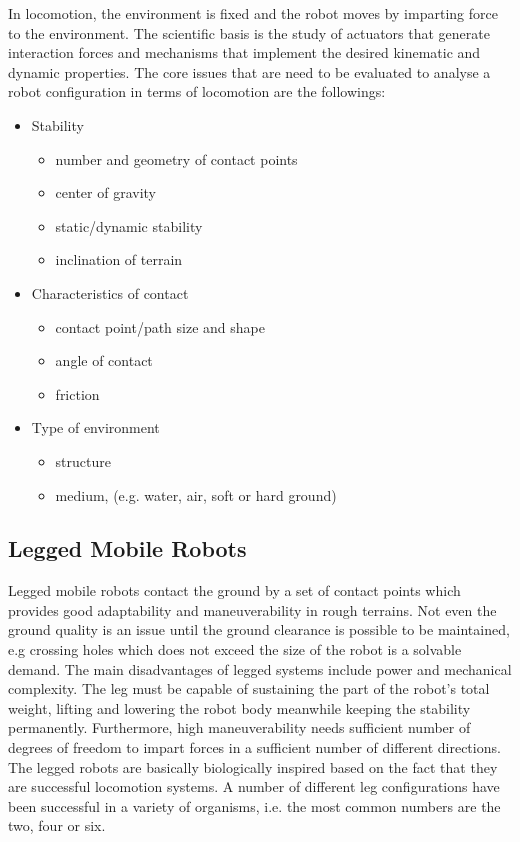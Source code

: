\documentclass[12pt,english]{article}
\begin{document}
In locomotion, the environment is fixed and the robot moves by imparting force to the environment. The scientific basis is the study of actuators that generate interaction forces and mechanisms that implement the desired kinematic and dynamic properties. The core issues that are need to be evaluated to analyse a robot configuration in terms of locomotion are the followings:
\begin{itemize}
	\item Stability
		\begin{itemize}
			\item number and geometry of contact points
			\item center of gravity
			\item static/dynamic stability
			\item inclination of terrain
		\end{itemize}
	\item Characteristics of contact
		\begin{itemize}
			\item contact point/path size and shape
			\item angle of contact
			\item friction
		\end{itemize}
	\item Type of environment
	\begin{itemize}
		\item structure
		\item medium, (e.g. water, air, soft or hard ground)
	\end{itemize}

\end{itemize}


\subsection{Legged Mobile Robots}
Legged mobile robots contact the ground by a set of contact points which provides good adaptability and maneuverability in rough terrains. Not even the ground quality is an issue until the ground clearance is possible to be maintained, e.g crossing holes which does not exceed the size of the robot is a solvable demand. The main disadvantages of legged systems include power and mechanical complexity. The leg must be capable of sustaining the part of the robot’s total weight, lifting and lowering the robot body meanwhile keeping the stability permanently. Furthermore, high maneuverability needs sufficient number of degrees of freedom to impart forces in a sufficient number of different directions.
The legged robots are basically biologically inspired based on the fact that they are successful locomotion systems. A number of different leg configurations have been successful in a variety of organisms, i.e. the most common numbers are the two, four or six.
\end{document}
